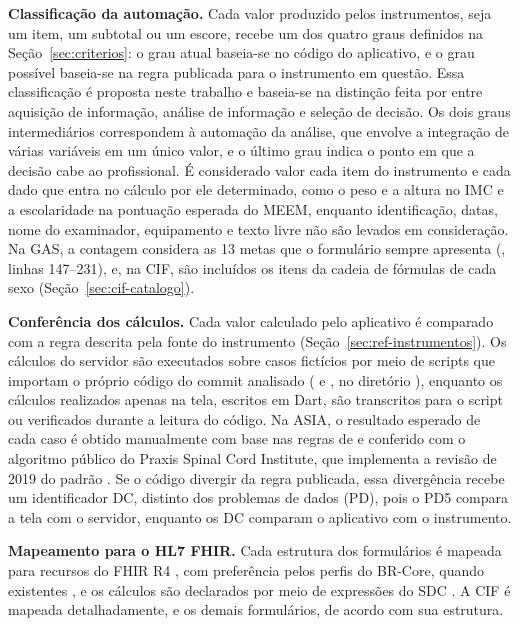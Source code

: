 \textbf{Classificação da automação.} Cada valor produzido pelos instrumentos, seja um item, um subtotal ou um escore,
recebe um dos quatro graus definidos na Seção~\ref{sec:criterios}: o grau atual baseia-se no código do aplicativo, e
o grau possível baseia-se na regra publicada para o instrumento em questão. Essa classificação é proposta neste
trabalho e baseia-se na distinção feita por  entre aquisição de
informação, análise de informação e seleção de decisão. Os dois graus intermediários correspondem à automação da
análise, que envolve a integração de várias variáveis em um único valor, e o último grau indica o ponto em que a
decisão cabe ao profissional. É considerado valor cada item do instrumento e cada dado que entra no cálculo por ele
determinado, como o peso e a altura no IMC e a escolaridade na pontuação esperada do MEEM, enquanto identificação,
datas, nome do examinador, equipamento e texto livre não são levados em consideração. Na GAS, a contagem considera as
13 metas que o formulário sempre apresenta (, linhas 147--231), e, na CIF, são incluídos os itens
da cadeia de fórmulas de cada sexo (Seção~\ref{sec:cif-catalogo}).

\textbf{Conferência dos cálculos.} Cada valor calculado pelo aplicativo é comparado com a regra descrita pela fonte
do instrumento (Seção~\ref{sec:ref-instrumentos}). Os cálculos do servidor são executados sobre casos fictícios por
meio de scripts que importam o próprio código do commit analisado ( e
, no diretório ), enquanto os cálculos realizados apenas na
tela, escritos em Dart, são transcritos para o script ou verificados durante a leitura do código. Na ASIA, o
resultado esperado de cada caso é obtido manualmente com base nas regras de
 e conferido com o algoritmo público do Praxis Spinal Cord
Institute, que implementa a revisão de 2019 do padrão \cite{praxis2023isncsci}. Se o código divergir da regra
publicada, essa divergência recebe um identificador DC, distinto dos problemas de dados (PD), pois o PD5 compara a
tela com o servidor, enquanto os DC comparam o aplicativo com o instrumento.

\textbf{Mapeamento para o HL7 FHIR.} Cada estrutura dos formulários é mapeada para recursos do FHIR R4
\cite{hl7fhirR4}, com preferência pelos perfis do BR-Core, quando existentes \cite{brcore2026}, e os cálculos são
declarados por meio de expressões do SDC \cite{hl7sdc}. A CIF é mapeada detalhadamente, e os demais formulários, de
acordo com sua estrutura.

